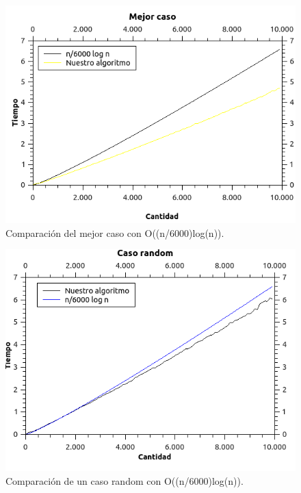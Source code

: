 \begin{figure}[H]
\begin{center}

  \includegraphics[width=\linewidth]{../graficos/ej2/Mejor.png}
  \caption{{\small Comparación del mejor caso con O((n/6000)log(n)).}} \label{ej2-mejor-caso}
\endminipage

\end{center}
\end{figure}


\begin{figure}[H]
\begin{center}

  \includegraphics[width=\linewidth]{../graficos/ej2/Random.png}
  \caption{{\small Comparación de un caso random con O((n/6000)log(n)).}} \label{ej2-random-caso}
\endminipage

\end{center}
\end{figure}

